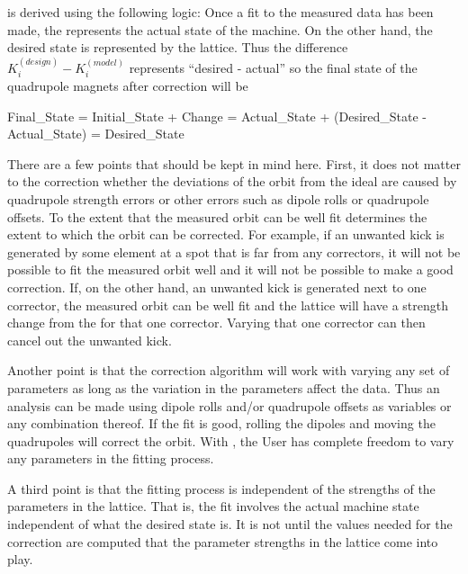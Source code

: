 {{{ is derived using the following logic: Once a fit to the measured data has been made, the
 represents the actual state of the machine. On the other hand, the desired state is
represented by the  lattice. Thus the difference $K_{i}^{(design)} - K_{i}^{(model)}$
represents ``desired - actual'' so the final state of the quadrupole magnets after correction will be
\begin{example}
  Final_State = Initial_State + Change
              = Actual_State + (Desired_State - Actual_State)
              = Desired_State
\end{example}
There are a few points that should be kept in mind here. First, it does not matter to the
correction whether the deviations of the orbit from the ideal are caused by quadrupole strength errors
or other errors such as dipole rolls or quadrupole offsets. To the extent that the measured orbit
can be well fit determines the extent to which the orbit can be corrected. For example, if an unwanted
kick is generated by some element at a spot that is far from any correctors, it will not be possible
to fit the measured orbit well and it will not be possible to make a good correction. If, on the
other hand, an unwanted kick is generated next to one corrector, the measured orbit can be well fit
and the  lattice will have a strength change from the  for that one
corrector. Varying that one corrector can then cancel out the unwanted kick.

Another point is that the correction algorithm will work with varying any set of parameters as long
as the variation in the parameters affect the  data. Thus an analysis can be made using
dipole rolls and/or quadrupole offsets as variables or any combination thereof. If the fit is good,
rolling the dipoles and moving the quadrupoles will correct the orbit. With \tao, the User has
complete freedom to vary any parameters in the fitting process.

A third point is that the fitting process is independent of the strengths of the parameters in the
 lattice. That is, the fit involves the actual machine state independent of what the
desired state is. It is not until the values needed for the correction are computed that the
parameter strengths in the  lattice come into play. 

}}}
